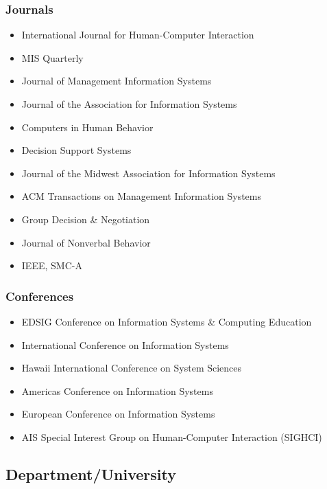 \documentclass[10pt, letter]{article}
\begin{document}
\subsubsection*{Journals}

\begin{itemize}
	\itemsep0em
	\item International Journal for Human-Computer Interaction
	\item MIS Quarterly
	\item Journal of Management Information Systems
	\item Journal of the Association for Information Systems
	\item Computers in Human Behavior
	\item Decision Support Systems
	\item Journal of the Midwest Association for Information Systems
	\item ACM Transactions on Management Information Systems
	\item Group Decision \& Negotiation
	\item Journal of Nonverbal Behavior
	\item IEEE, SMC-A
\end{itemize}

\subsubsection*{Conferences}

\begin{itemize}
	\itemsep0em
	\item EDSIG Conference on Information Systems \& Computing Education
	\item International Conference on Information Systems
	\item Hawaii International Conference on System Sciences
	\item Americas Conference on Information Systems
	\item European Conference on Information Systems
	\item AIS Special Interest Group on Human-Computer Interaction (SIGHCI)
\end{itemize}

\subsection*{Department/University}
\end{document}
